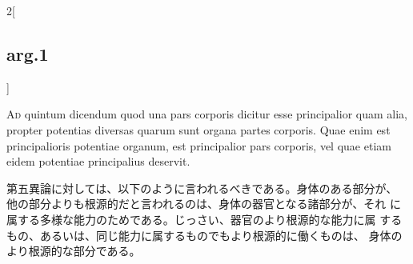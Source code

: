 \documentclass[paper=a4paper,fontsize=10pt,jafontsize=9pt,titlepage]{jlreq}
\begin{document}
\begin{paracol}{2}[\subsection{arg.1}]
\switchcolumn*[\subsection{ad 5}]



 {\scshape Ad} quintum dicendum quod una pars corporis dicitur esse
 principalior quam alia, propter potentias diversas quarum sunt organa
 partes corporis. Quae enim est principalioris potentiae organum, est
 principalior pars corporis, vel quae etiam eidem potentiae
 principalius deservit.

 \switchcolumn

 第五異論に対しては、以下のように言われるべきである。身体のある部分が、
 他の部分よりも根源的だと言われるのは、身体の器官となる諸部分が、それ
 に属する多様な能力のためである。じっさい、器官のより根源的な能力に属
 するもの、あるいは、同じ能力に属するものでもより根源的に働くものは、
 身体のより根源的な部分である。

\switchcolumn*

 
\end{paracol}
\end{document}
